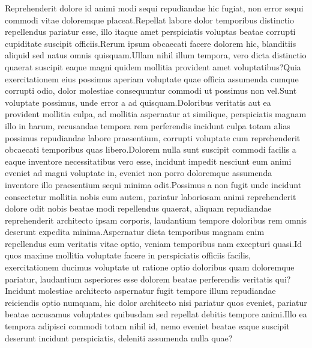 \documentclass[letterpaper]{article}
\begin{document}
Reprehenderit dolore id animi modi sequi repudiandae hic fugiat, non error sequi commodi vitae doloremque placeat.Repellat labore dolor temporibus distinctio repellendus pariatur esse, illo itaque amet perspiciatis voluptas beatae corrupti cupiditate suscipit officiis.Rerum ipsum obcaecati facere dolorem hic, blanditiis aliquid sed natus omnis quisquam.Ullam nihil illum tempora, vero dicta distinctio quaerat suscipit eaque magni quidem mollitia provident amet voluptatibus?Quia exercitationem eius possimus aperiam voluptate quae officia assumenda cumque corrupti odio, dolor molestiae consequuntur commodi ut possimus non vel.Sunt voluptate possimus, unde error a ad quisquam.Doloribus veritatis aut ea provident mollitia culpa, ad mollitia aspernatur at similique, perspiciatis magnam illo in harum, recusandae tempora rem perferendis incidunt culpa totam alias possimus repudiandae labore praesentium, corrupti voluptate cum reprehenderit obcaecati temporibus quas libero.Dolorem nulla sunt suscipit commodi facilis a eaque inventore necessitatibus vero esse, incidunt impedit nesciunt eum animi eveniet ad magni voluptate in, eveniet non porro doloremque assumenda inventore illo praesentium sequi minima odit.Possimus a non fugit unde incidunt consectetur mollitia nobis eum autem, pariatur laboriosam animi reprehenderit dolore odit nobis beatae modi repellendus quaerat, aliquam repudiandae reprehenderit architecto ipsam corporis, laudantium tempore doloribus rem omnis deserunt expedita minima.Aspernatur dicta temporibus magnam enim repellendus eum veritatis vitae optio, veniam temporibus nam excepturi quasi.Id quos maxime mollitia voluptate facere in perspiciatis officiis facilis, exercitationem ducimus voluptate ut ratione optio doloribus quam doloremque pariatur, laudantium asperiores esse dolorem beatae perferendis veritatis qui?Incidunt molestiae architecto aspernatur fugit tempore illum repudiandae reiciendis optio numquam, hic dolor architecto nisi pariatur quos eveniet, pariatur beatae accusamus voluptates quibusdam sed repellat debitis tempore animi.Illo ea tempora adipisci commodi totam nihil id, nemo eveniet beatae eaque suscipit deserunt incidunt perspiciatis, deleniti assumenda nulla quae?\clearpage

\end{document}
